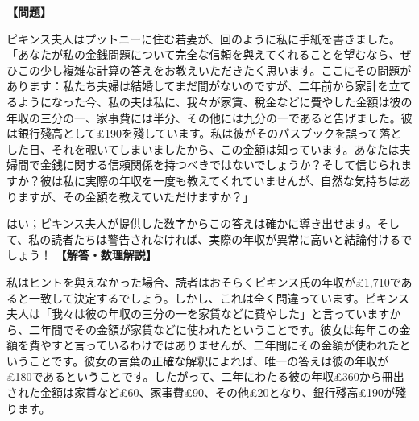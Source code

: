 \documentclass[10pt,a4paper,oneside,openany]{ltjsbook}
\begin{document}
\begin{tcolorbox}[colback=softblue,colframe=primaryblue,title=\textbf{第 31 問：家庭経済に関するパズル （原題: DOMESTIC ECONOMY.）},arc=2mm,boxrule=1pt,breakable]
\textbf{【問題】}\par\vspace{0.3em}
ピキンス夫人はプットニーに住む若妻が、回のように私に手紙を書きました。「あなたが私の金銭問題について完全な信頼を與えてくれることを望むなら、ぜひこの少し複雑な計算の答えをお教えいただきたく思います。ここにその問題があります：私たち夫婦は結婚してまだ間がないのですが、二年前から家計を立てるようになった今、私の夫は私に、我々が家賃、稅金などに費やした金額は彼の年収の三分の一、家事費には半分、その他には九分の一であると告げました。彼は銀行殘高として£190を殘しています。私は彼がそのパスブックを誤って落とした日、それを覗いてしまいましたから、この金額は知っています。あなたは夫婦間で金銭に関する信頼関係を持つべきではないでしょうか？そして信じられますか？彼は私に実際の年収を一度も教えてくれていませんが、自然な気持ちはありますが、その金額を教えていただけますか？」

はい；ピキンス夫人が提供した数字からこの答えは確かに導き出せます。そして、私の読者たちは警告されなければ、実際の年収が異常に高いと結論付けるでしょう！
\tcblower
\textbf{【解答・数理解説】}\par\vspace{0.3em}
私はヒントを與えなかった場合、読者はおそらくピキンス氏の年収が£1,710であると一致して決定するでしょう。しかし、これは全く間違っています。ピキンス夫人は「我々は彼の年収の三分の一を家賃などに費やした」と言っていますから、二年間でその金額が家賃などに使われたということです。彼女は毎年この金額を費やすと言っているわけではありませんが、二年間にその金額が使われたということです。彼女の言葉の正確な解釈によれば、唯一の答えは彼の年収が£180であるということです。したがって、二年にわたる彼の年収£360から冊出された金額は家賃など£60、家事費£90、その他£20となり、銀行殘高£190が殘ります。
\end{tcolorbox}
\end{document}

